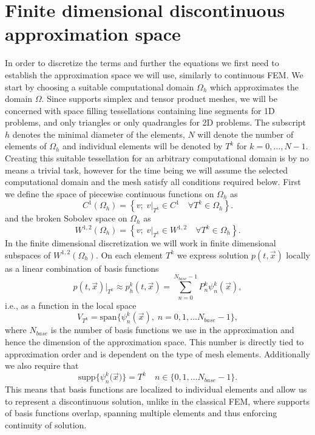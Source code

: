 \section{Finite dimensional discontinuous approximation space}
In order to discretize the terms and further the equations we first need to
establish the approximation space we will use, similarly to continuous FEM. We
start by choosing a suitable computational domain $\Omega_h$ which approximates
the domain $\Omega$. Since \sfepy{} supports simplex and tensor product meshes, we
will be concerned with space filling tessellations containing line segments
for 1D problems, and only triangles or only quadrangles for 2D
problems. The subscript $h$ denotes the minimal diameter of the elements,
$N$ will denote the number of elements of $\Omega_h$ and individual elements
will be denoted by $T^k$ for $k=0, \ldots, N - 1$. Creating this suitable
tessellation for an arbitrary computational domain is by no means a trivial task,
however for the time being we will assume the selected computational domain and
the mesh satisfy all conditions required below. First we define the space of
piecewise continuous functions on $\Omega_h$ as
\begin{equation}
\label{eq:sp_conth}
C^1(\Omega_h) =  \left\{v;\; v\vert_{T^k} \in C^1 \quad \forall T^k \in
\Omega_h \right\}.
\end{equation}
and the broken Sobolev space on $\Omega_h$ as
\begin{equation}
\label{eq:sp_sobh}
W^{1, 2}(\Omega_h) = \left\{v;\; v\vert_{T^k} \in W^{1, 2}\quad \forall T^k
\in \Omega_h \right\}.
\end{equation}
In the finite dimensional discretization we will work in finite dimensional
subspaces of $W^{1, 2}(\Omega_h)$. On each element $T^k$ we express
solution $p(t, \vec{x})$ locally as a linear combination of basis functions
\begin{equation}
\label{eq:el_lin_comb}
p(t, \vec{x})|_{T^k} \approx p_h^k(t, \vec{x}) = \sum\limits_{n=0}^{N_{base} - 1}
P_n^k\psi^k_n(\vec{x}),
\end{equation}
i.e., as a function in the local space
\begin{equation}
V_{T^k} = \text{span}\big\{ \psi_n^k(\vec{x}), \; n = 0,1, \dots
N_{base}-1\big\},
\end{equation}
where $N_{base}$ is the number of basis functions we use in the approximation and hence
the dimension of the approximation space. This number is directly tied to approximation
order and is dependent on the type of mesh elements. Additionally we also require that
\begin{equation}
\text{supp}\big\{\psi_n^k(\vec{x}\big)\} = T^k \quad n \in \{0,1,
\dots  N_{base}-1\}.
\end{equation}
This means that basis functions are localized to individual elements and allow
us to represent a discontinuous solution, unlike in the classical FEM, where
supports of basis functions overlap, spanning multiple elements and  thus
enforcing continuity of solution.

